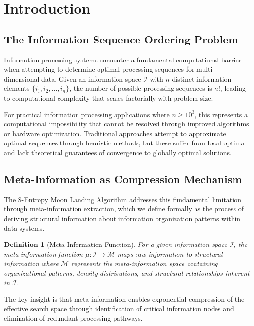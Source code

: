 \documentclass[12pt,a4paper]{article}
\newtheorem{definition}{Definition}
\begin{document}
\section{Introduction}

\subsection{The Information Sequence Ordering Problem}

Information processing systems encounter a fundamental computational barrier when attempting to determine optimal processing sequences for multi-dimensional data. Given an information space $\mathcal{I}$ with $n$ distinct information elements $\{i_1, i_2, ..., i_n\}$, the number of possible processing sequences is $n!$, leading to computational complexity that scales factorially with problem size.

For practical information processing applications where $n \geq 10^3$, this represents a computational impossibility that cannot be resolved through improved algorithms or hardware optimization. Traditional approaches attempt to approximate optimal sequences through heuristic methods, but these suffer from local optima and lack theoretical guarantees of convergence to globally optimal solutions.

\subsection{Meta-Information as Compression Mechanism}

The S-Entropy Moon Landing Algorithm addresses this fundamental limitation through meta-information extraction, which we define formally as the process of deriving structural information about information organization patterns within data systems.

\begin{definition}[Meta-Information Function]
For a given information space $\mathcal{I}$, the meta-information function $\mu: \mathcal{I} \to \mathcal{M}$ maps raw information to structural information where $\mathcal{M}$ represents the meta-information space containing organizational patterns, density distributions, and structural relationships inherent in $\mathcal{I}$.
\end{definition}

The key insight is that meta-information enables exponential compression of the effective search space through identification of critical information nodes and elimination of redundant processing pathways.
\end{document}
